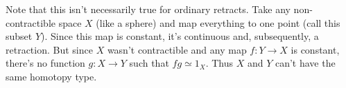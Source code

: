 \documentclass[twoside,10pt]{report}
\begin{document}
Note that this isn't necessarily true for ordinary retracts. Take any non-contractible space $X$ (like a sphere) and map everything to one point (call this subset $Y$). Since this map is constant, it's continuous and, subsequently, a retraction. But since $X$ wasn't contractible and any map $f:Y\to X$ is constant, there's no function $g:X\to Y$ such that $fg \simeq 1_{X}$. Thus $X$ and $Y$ can't have the same homotopy type.
\end{document}
